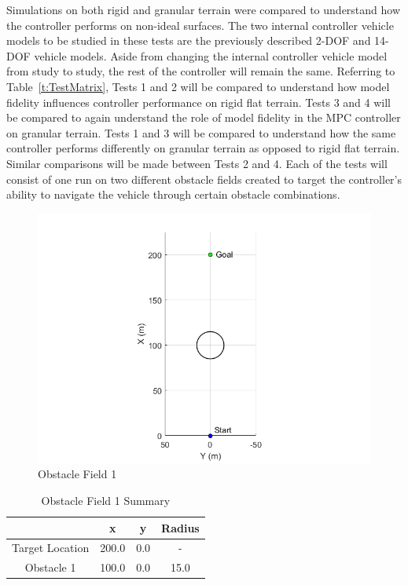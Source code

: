 \documentclass[12pt,twocolumn]{article}
\begin{document}
Simulations on both rigid and granular terrain were compared to understand how the controller performs on non-ideal surfaces.  The two internal controller vehicle models to be studied in these tests are the previously described 2-DOF and 14-DOF vehicle models. Aside from changing the internal controller vehicle model from study to study, the rest of the controller will remain the same. Referring to Table~\ref{t:TestMatrix}, Tests 1 and 2 will be compared to understand how model fidelity influences controller performance on rigid flat terrain. Tests 3 and 4 will be compared to again understand the role of model fidelity in the MPC controller on granular terrain. Tests 1 and 3 will be compared to understand how the same controller performs differently on granular terrain as opposed to rigid flat terrain. Similar comparisons will be made between Tests 2 and 4. Each of the tests will consist of one run on two different obstacle fields created to target the controller’s ability to navigate the vehicle through certain obstacle combinations.

\begin{figure}
	\centering
	\includegraphics[width=\columnwidth]{Figs/ObstacleField1.png}
	\caption{\small Obstacle Field 1}  
	\label{fig:Obst1}
\end{figure}

\begin{table}
\begin{center}
	\begin{tabular}{||c|c|c|c||} 
		\hline
		& x & y & Radius\\
		\hline
		Target Location  & 200.0 & 0.0 & -\\ 
		\hline
		Obstacle 1 & 100.0 & 0.0 & 15.0\\
		\hline
	\end{tabular}
\end{center}
\caption{Obstacle Field 1 Summary}
\label{t:Obst1Summary}
\end{table}
\end{document}
